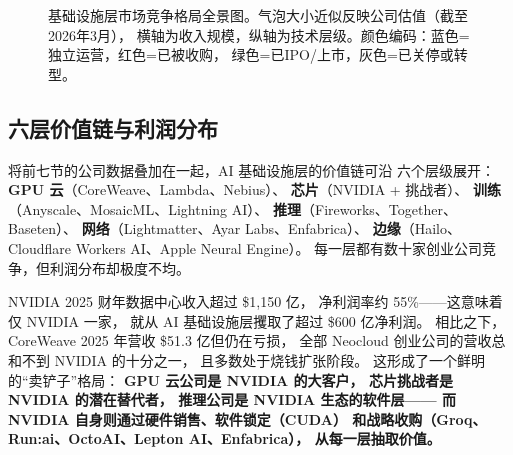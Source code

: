 \begin{figure}[htbp]
\caption{基础设施层市场竞争格局全景图。气泡大小近似反映公司估值（截至2026年3月），
横轴为收入规模，纵轴为技术层级。颜色编码：蓝色=独立运营，红色=已被收购，
绿色=已IPO/上市，灰色=已关停或转型。}
\label{fig:infra-market-map}
\end{figure}


\subsection{六层价值链与利润分布}

将前七节的公司数据叠加在一起，AI 基础设施层的价值链可沿
六个层级展开：\textbf{GPU 云}（CoreWeave、Lambda、Nebius）、
\textbf{芯片}（NVIDIA + 挑战者）、
\textbf{训练}（Anyscale、MosaicML、Lightning AI）、
\textbf{推理}（Fireworks、Together、Baseten）、
\textbf{网络}（Lightmatter、Ayar Labs、Enfabrica）、
\textbf{边缘}（Hailo、Cloudflare Workers AI、Apple Neural Engine）。
每一层都有数十家创业公司竞争，但利润分布却极度不均。

\begin{keybox}[谁拿走了最多利润？]
NVIDIA 2025 财年数据中心收入超过 \$1,150 亿，
净利润率约 55\%——这意味着仅 NVIDIA 一家，
就从 AI 基础设施层攫取了超过 \$600 亿净利润。
相比之下，CoreWeave 2025 年营收 \$51.3 亿但仍在亏损，
全部 Neocloud 创业公司的营收总和不到 NVIDIA 的十分之一，
且多数处于烧钱扩张阶段。
这形成了一个鲜明的``卖铲子''格局：
\textbf{GPU 云公司是 NVIDIA 的大客户，
芯片挑战者是 NVIDIA 的潜在替代者，
推理公司是 NVIDIA 生态的软件层——
而 NVIDIA 自身则通过硬件销售、软件锁定（CUDA）
和战略收购（Groq、Run:ai、OctoAI、Lepton AI、Enfabrica），
从每一层抽取价值。}
\end{keybox}

